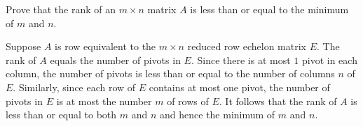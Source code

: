 \documentclass{ximera}
\begin{document}
\begin{exercise} \label{A:2.4.1}
  Prove that the rank of an $m \times n$ matrix $A$ is less than or equal to
  the minimum of $m$ and $n$.

\begin{solution}
\soln 
Suppose $A$ is row equivalent to the $m \times n$ reduced row echelon matrix $E$.  The rank of $A$ equals the number of pivots in $E$. Since there is at most $1$ pivot in each column, the number of pivots is less than or equal to the number of columns $n$ of $E$.  Similarly, since each row of $E$ contains at most one pivot, the number of pivots in $E$ is at most the number $m$ of rows of $E$.  It follows that the rank of $A$ is less than or equal to both $m$ and $n$ and hence the minimum of $m$ and $n$.  
\end{solution}
\end{exercise}
\end{document}

